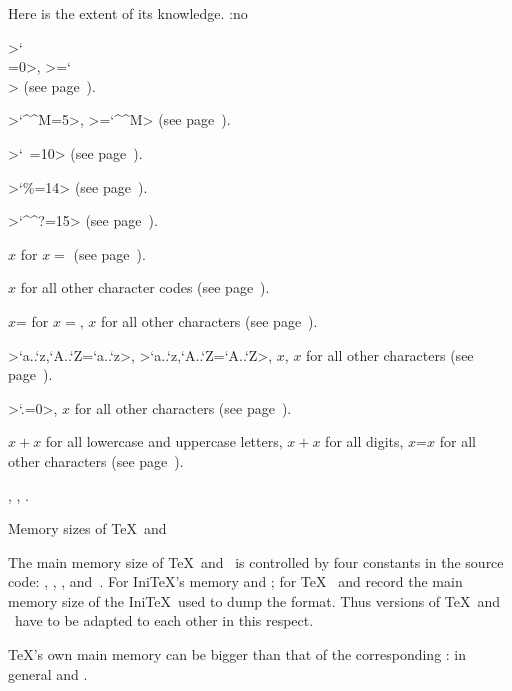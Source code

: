 Here is the extent of its knowledge.
\itemlist \mathsurround=1.5pt
\flushright:no
\item \ver>\catcode`\\=0>, \ver>\escapechar=`\\>
      (see page~).
\item \ver>\catcode`\^^M=5>, \ver>\endlinechar=`\^^M>
      (see page~).
\item \ver>\catcode`\ =10>
      (see page~\pgref[ini:sp]).
\item \ver>\catcode`\%=14>
      (see page~).
\item \ver>\catcode`\^^?=15>
      (see page~).
\item {}$x$ for $x={}$
      (see page~).
\item {}$x$ for all other character codes\nl
      (see page~).
\item {}$x$= for $x={}$,
      $x$ for all other characters
      (see page~\pgref[ini:sf]).
\item \ver>\lccode`a..`z,`A..`Z=`a..`z>, \ver>\uccode`a..`z,`A..`Z=`A..`Z>,
      $x$, $x$ for all other characters
      (see page~).
\item \ver>\delcode`.=0>, $x$ for all other characters
      (see page~).
\item {}$x$${}+x$ for all lowercase and uppercase
      letters, $x$${}+x$ for all digits,
      $x$\n=$x$ for all other characters
      (see page~).
\item {}, ,
      .
\>

\spoint Memory sizes of \TeX\ and \IniTeX

The main memory size of \TeX\ and \IniTeX\ is controlled by
four constants in the source code:
, , , and~.
For Ini\TeX's memory  
and ;
for \TeX\  and  record the main memory
size of the Ini\TeX\ used to dump the format.
Thus versions of \TeX\ and \IniTeX\ have to be adapted
to each other in this    respect.

\TeX's own main memory can be bigger than that of the
corresponding \IniTeX: in general
 and .


